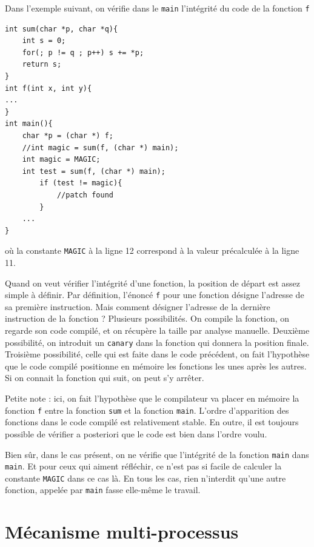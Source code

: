 \documentclass{book}
\begin{document}
Dans l'exemple suivant, on vérifie dans le {\tt main} l'intégrité du code de la fonction {\tt f}
\begin{verbatim}
int sum(char *p, char *q){
	int s = 0; 
	for(; p != q ; p++) s += *p;
	return s;
}
int f(int x, int y){
...
}
int main(){
	char *p = (char *) f;
	//int magic = sum(f, (char *) main);
	int magic = MAGIC;
	int test = sum(f, (char *) main);
        if (test != magic){
        	//patch found
        } 
	...
}
\end{verbatim}
où la constante  {\tt MAGIC} à la ligne 12 correspond à la valeur  précalculée à la ligne 11. 

Quand on veut vérifier l'intégrité d'une fonction, la position de départ est assez simple à définir. Par définition, l'énoncé {\tt f} pour une fonction désigne l'adresse de sa première instruction. Mais comment désigner l'adresse de la dernière instruction de la fonction ? Plusieurs possibilités. On compile la fonction, on regarde son code compilé, et on récupère la taille par analyse manuelle. Deuxième possibilité, on introduit un {\tt canary} dans la fonction qui donnera la position finale. Troisième possibilité, celle qui est faite dans le code précédent, on fait l'hypothèse que le code compilé positionne en mémoire les fonctions les unes après les autres. Si on connait la fonction qui suit, on peut s'y arrêter.

Petite note : ici, on fait l'hypothèse que le compilateur va placer en mémoire la fonction {\tt f} entre la fonction {\tt sum} et la fonction {\tt main}. L'ordre d'apparition des fonctions dans le code compilé est relativement stable. En outre, il est toujours possible de vérifier a posteriori que le code est bien dans l'ordre voulu. 


Bien sûr, dans le cas présent, on ne vérifie que l'intégrité de la fonction {\tt main} dans {\tt main}. Et pour ceux qui aiment réfléchir, ce n'est pas si facile de calculer la constante {\tt MAGIC} dans ce cas là. En tous les cas, rien n'interdit qu'une autre fonction, appelée par {\tt main} fasse elle-même le travail. 




\section{Mécanisme multi-processus}






\end{document}
